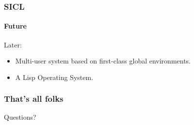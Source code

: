 \documentclass{beamer}
\begin{document}
\begin{frame}
  \frametitle{SICL}
  \framesubtitle{Future}
Later:
\begin{itemize}
\item Multi-user system based on first-class global environments. 
\item A Lisp Operating System.
\end{itemize}
\end{frame}
\begin{frame}
  \frametitle{That's all folks}
  
Questions?

\end{frame}
\end{document}
